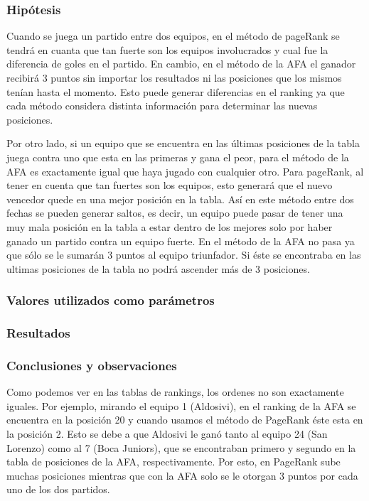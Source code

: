 		\subsubsection*{Hipótesis} 
		Cuando se juega un partido entre dos equipos, en el método de pageRank se tendrá en cuanta que tan fuerte son los equipos involucrados y cual fue la diferencia de goles en el partido. En cambio, en el método de la AFA el ganador recibirá 3 puntos sin importar los resultados ni las posiciones que los mismos tenían hasta el momento. Esto puede generar diferencias en el ranking ya que cada método considera distinta información para determinar las nuevas posiciones. 
		
		Por otro lado, si un equipo que se encuentra en las últimas posiciones de la tabla juega contra uno que esta en las primeras y gana el peor, para el método de la AFA es exactamente igual que haya jugado con cualquier otro. Para pageRank, al tener en cuenta que tan fuertes son los equipos, esto generará que el nuevo vencedor quede en una mejor posición en la tabla. Así en este método entre dos fechas se pueden generar saltos, es decir, un equipo puede pasar de tener una muy mala posición en la tabla a estar dentro de los mejores solo por haber ganado un partido contra un equipo fuerte. En el método de la AFA no pasa ya que sólo se le sumarán 3 puntos al equipo triunfador. Si éste se encontraba en las ultimas posiciones de la tabla no podrá ascender más de 3 posiciones. 		

		\subsubsection*{Valores utilizados como parámetros} 

		\subsubsection*{Resultados}

		\subsubsection*{Conclusiones y observaciones}

		Como podemos ver en las tablas de rankings, los ordenes no son exactamente iguales. Por ejemplo, mirando el equipo 1 (Aldosivi), en el ranking de la AFA se encuentra en la posición 20 y cuando usamos el método de PageRank éste esta en la posición 2. Esto se debe a que Aldosivi le ganó tanto al equipo 24 (San Lorenzo) como al 7 (Boca Juniors), que se encontraban primero y segundo en la tabla de posiciones de la AFA, respectivamente. Por esto, en PageRank sube muchas posiciones mientras que con la AFA solo se le otorgan 3 puntos por cada uno de los dos partidos.

